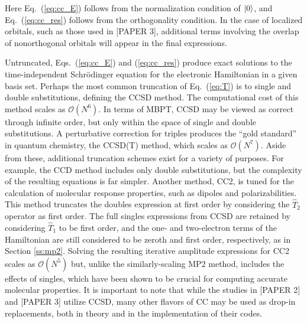 Here Eq.~(\ref{eq:cc_E}) follows from the normalization condition of $| 0 \rangle$, 
and Eq.~(\ref{eq:cc_res}) follows from the orthogonality condition. 
In the case of localized orbitals, such as those used in [PAPER 3], additional terms 
involving the overlap of nonorthogonal orbitals will appear in the final expressions. 

Untruncated, Eqs.~(\ref{eq:cc_E}) and (\ref{eq:cc_res}) produce exact
solutions to the time-independent Schr\"odinger equation for the
electronic Hamiltonian in a given basis set. Perhaps the most common
truncation of Eq.~(\ref{eq:T}) is to single and double substitutions,
defining the CCSD method. The computational cost of this method scales as
$\mathcal{O}(N^6)$. In terms of MBPT, CCSD may be viewed as correct through
infinite order, but only within the space of single and double substitutions.
A perturbative correction for triples produces the ``gold standard'' in
quantum chemistry, the CCSD(T) method, \cite{Raghavachari1989,Bartlett2005}
which scales as $\mathcal{O}(N^7)$. Aside from these, additional truncation
schemes exist for a variety of purposes. For example, the CCD method
includes only double substitutions, but the complexity of the resulting
equations is far simpler. Another method, CC2,\cite{Christiansen1995}
is tuned for the calculation of molecular response properties, such as
dipoles and polarizabilities. This method truncates the doubles expression
at first order by considering the $\hat{T}_2$ operator as first order. The
full singles expressions from CCSD are retained by considering $\hat{T}_1$
to be first order, and the one- and two-electron terms of the Hamiltonian are
still considered to be zeroth and first order, respectively, as in Section
\ref{ss:mp2}. Solving the resulting iterative amplitude expressions for CC2
scales as $\mathcal{O}(N^5)$ but, unlike the similarly-scaling MP2 method,
includes the effects of singles, which have been shown to be crucial for
computing accurate molecular properties.
\cite{Christiansen1995,Koch1997}
It is important to note that while the studies in [PAPER 2] and [PAPER 3]
utilize CCSD, many other flavors of CC may be used as drop-in replacements,
both in theory and in the implementation of their codes.

